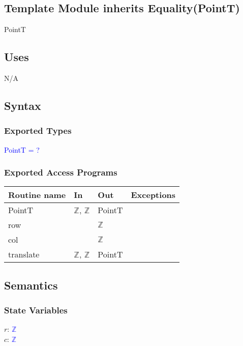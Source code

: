 \documentclass[12pt]{article}
\begin{document}
\subsection*{Template Module inherits Equality(PointT)}

PointT

\subsection* {Uses}

N/A

\subsection* {Syntax}

\subsubsection* {Exported Types}

\textcolor{blue}{PointT = ?}

\subsubsection* {Exported Access Programs}

\begin{tabular}{| l | l | l | l |}
\hline
\textbf{Routine name} & \textbf{In} & \textbf{Out} & \textbf{Exceptions}\\
\hline
PointT & $\mathbb{Z}$, $\mathbb{Z}$ & PointT & \\
\hline
row & ~ & $\mathbb{Z}$ & ~\\
\hline
col & ~ & $\mathbb{Z}$ & ~\\
\hline
translate & $\mathbb{Z}$, $\mathbb{Z}$ & PointT & ~\\
\hline
\end{tabular}

\subsection* {Semantics}

\subsubsection* {State Variables}

$r$: \textcolor{blue}{$\mathbb{Z}$}\\
$c$: \textcolor{blue}{$\mathbb{Z}$}\\
\end{document}
